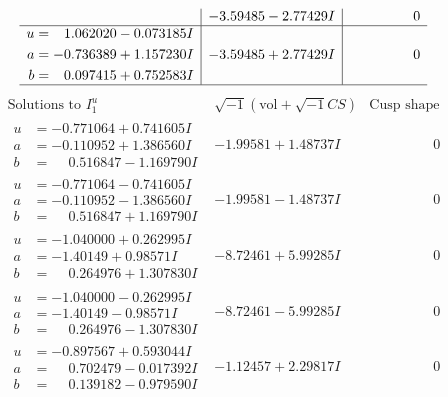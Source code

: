 \documentclass[1p]{elsarticle_modified}
\theoremstyle{definition}
\newcommand{\I}{\sqrt{-1}}
\begin{document}
$$\begin{array}{c|c|c}
 & -3.59485 - 2.77429 I & \phantom{-0.000000 } 0 \\ \hline\begin{aligned}
u &= \phantom{-}1.062020 - 0.073185 I \\
a &= -0.736389 + 1.157230 I \\
b &= \phantom{-}0.097415 + 0.752583 I\end{aligned}
 & -3.59485 + 2.77429 I & \phantom{-0.000000 } 0\\
 \hline 
 \end{array}$$\newpage$$\begin{array}{c|c|c}  
\text{Solutions to }I^u_{1}& \I (\text{vol} + \sqrt{-1}CS) & \text{Cusp shape}\\
 \hline 
\begin{aligned}
u &= -0.771064 + 0.741605 I \\
a &= -0.110952 + 1.386560 I \\
b &= \phantom{-}0.516847 - 1.169790 I\end{aligned}
 & -1.99581 + 1.48737 I & \phantom{-0.000000 } 0 \\ \hline\begin{aligned}
u &= -0.771064 - 0.741605 I \\
a &= -0.110952 - 1.386560 I \\
b &= \phantom{-}0.516847 + 1.169790 I\end{aligned}
 & -1.99581 - 1.48737 I & \phantom{-0.000000 } 0 \\ \hline\begin{aligned}
u &= -1.040000 + 0.262995 I \\
a &= -1.40149 + 0.98571 I \\
b &= \phantom{-}0.264976 + 1.307830 I\end{aligned}
 & -8.72461 + 5.99285 I & \phantom{-0.000000 } 0 \\ \hline\begin{aligned}
u &= -1.040000 - 0.262995 I \\
a &= -1.40149 - 0.98571 I \\
b &= \phantom{-}0.264976 - 1.307830 I\end{aligned}
 & -8.72461 - 5.99285 I & \phantom{-0.000000 } 0 \\ \hline\begin{aligned}
u &= -0.897567 + 0.593044 I \\
a &= \phantom{-}0.702479 - 0.017392 I \\
b &= \phantom{-}0.139182 - 0.979590 I\end{aligned}
 & -1.12457 + 2.29817 I & \phantom{-0.000000 } 0 \\ \hline\begin{aligned}

\end{aligned}
\end{array}$$
\end{document}
